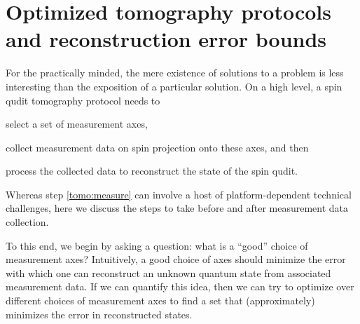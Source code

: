 \documentclass[notitlepage,twocolumn]{revtex4-2}
\newcommand{\1}{\mathds{1}}
\begin{document}
\section{Optimized tomography protocols and reconstruction error bounds}
\label{sec:protocol}

For the practically minded, the mere existence of solutions to a problem is less interesting than the exposition of a particular solution.
On a high level, a spin qudit tomography protocol needs to
\begin{enumerate*}
\item select a set of measurement axes,
  \label{tomo:select}
\item collect measurement data on spin projection onto these axes, and then
  \label{tomo:measure}
\item process the collected data to reconstruct the state of the spin qudit.
  \label{tomo:process}
\end{enumerate*}
Whereas step \ref{tomo:measure} can involve a host of platform-dependent technical challenges, here we discuss the steps to take before and after measurement data collection.

To this end, we begin by asking a question: what is a ``good'' choice of measurement axes?
Intuitively, a good choice of axes should minimize the error with which one can reconstruct an unknown quantum state from associated measurement data.
If we can quantify this idea, then we can try to optimize over different choices of measurement axes to find a set that (approximately) minimizes the error in reconstructed states.
\end{document}
